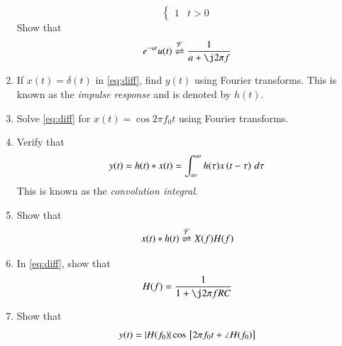 \documentclass[journal,12pt,twocolumn]{IEEEtran}
\begin{document}
\begin{enumerate}[1.]
\begin{equation}
\begin{cases}
1 & t > 0
\end{cases}
\end{equation}
Show that
\begin{equation}
e^{-at}u(t) \fourier \frac{1}{a+\j 2\pi f}
\end{equation}
\item If $x(t) = \delta(t)$ in \eqref{eq:diff}, find $y(t)$ using Fourier transforms. This is known as the {\em impulse response} and is denoted by $h(t)$.
\item Solve \eqref{eq:diff} for $x(t) = \cos 2\pi f_0 t$ using Fourier transforms.
\item Verify that
\begin{equation}
y(t) = h(t)*x(t) = \int_{\infty}^{\infty}h(\tau)x\left(t-\tau\right)\, d\tau
\end{equation}
This is known as the {\em convolution integral}.
\item Show that
\begin{equation}
x(t)*h(t) \overset{\mathcal{F}}{ \rightleftharpoons} X(f)H(f)
\end{equation}
\item In  \eqref{eq:diff}, show that
\begin{equation}
H(f) = \frac{1}{1+\j 2\pi f RC}
\end{equation}
\item Show that 
\begin{equation}
y(t) = \left\vert H(f_0)\right\vert\cos{}\left[2\pi f_0 t + \angle H(f_0)\right]
\end{equation}
\end{enumerate}
\end{document}

